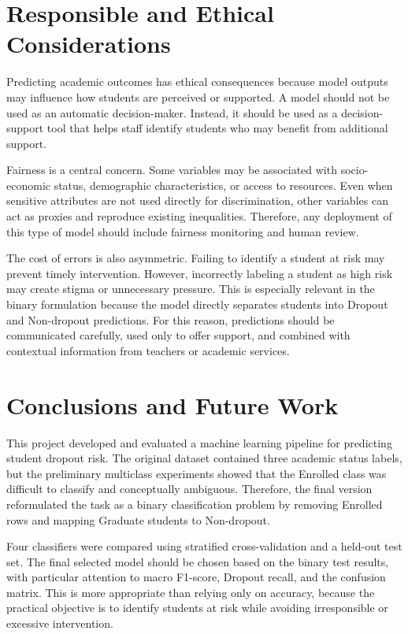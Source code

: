 \documentclass[lettersize,journal]{IEEEtran}
\begin{document}
\section{Responsible and Ethical Considerations}
Predicting academic outcomes has ethical consequences because model outputs may influence how students are perceived or supported. A model should not be used as an automatic decision-maker. Instead, it should be used as a decision-support tool that helps staff identify students who may benefit from additional support.

Fairness is a central concern. Some variables may be associated with socio-economic status, demographic characteristics, or access to resources. Even when sensitive attributes are not used directly for discrimination, other variables can act as proxies and reproduce existing inequalities. Therefore, any deployment of this type of model should include fairness monitoring and human review.

The cost of errors is also asymmetric. Failing to identify a student at risk may prevent timely intervention. However, incorrectly labeling a student as high risk may create stigma or unnecessary pressure. This is especially relevant in the binary formulation because the model directly separates students into Dropout and Non-dropout predictions. For this reason, predictions should be communicated carefully, used only to offer support, and combined with contextual information from teachers or academic services.

\section{Conclusions and Future Work}
This project developed and evaluated a machine learning pipeline for predicting student dropout risk. The original dataset contained three academic status labels, but the preliminary multiclass experiments showed that the Enrolled class was difficult to classify and conceptually ambiguous. Therefore, the final version reformulated the task as a binary classification problem by removing Enrolled rows and mapping Graduate students to Non-dropout.

Four classifiers were compared using stratified cross-validation and a held-out test set. The final selected model should be chosen based on the binary test results, with particular attention to macro F1-score, Dropout recall, and the confusion matrix. This is more appropriate than relying only on accuracy, because the practical objective is to identify students at risk while avoiding irresponsible or excessive intervention.
\end{document}
